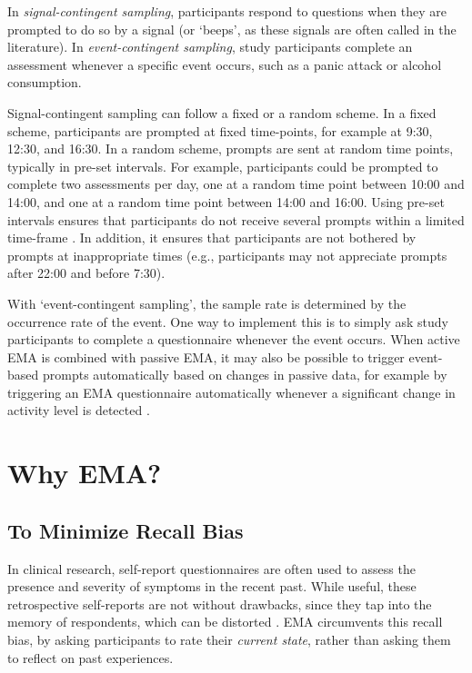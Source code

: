 \documentclass[]{book}
\begin{document}
In \emph{signal-contingent sampling}, participants respond to questions
when they are prompted to do so by a signal (or `beeps', as these
signals are often called in the literature). In \emph{event-contingent
sampling}, study participants complete an assessment whenever a specific
event occurs, such as a panic attack or alcohol consumption.

Signal-contingent sampling can follow a fixed or a random scheme. In a
fixed scheme, participants are prompted at fixed time-points, for
example at 9:30, 12:30, and 16:30. In a random scheme, prompts are sent
at random time points, typically in pre-set intervals. For example,
participants could be prompted to complete two assessments per day, one
at a random time point between 10:00 and 14:00, and one at a random time
point between 14:00 and 16:00. Using pre-set intervals ensures that
participants do not receive several prompts within a limited time-frame
\citep{Piasecki2007}. In addition, it ensures that participants are not
bothered by prompts at inappropriate times (e.g., participants may not
appreciate prompts after 22:00 and before 7:30).

With `event-contingent sampling', the sample rate is determined by the
occurrence rate of the event. One way to implement this is to simply ask
study participants to complete a questionnaire whenever the event
occurs. When active EMA is combined with passive EMA, it may also be
possible to trigger event-based prompts automatically based on changes
in passive data, for example by triggering an EMA questionnaire
automatically whenever a significant change in activity level is
detected \citep{Smyth2003}.

\section{Why EMA?}\label{why-ema}

\subsection{To Minimize Recall Bias}\label{to-minimize-recall-bias}


In clinical research, self-report questionnaires are often used to
assess the presence and severity of symptoms in the recent past. While
useful, these retrospective self-reports are not without drawbacks,
since they tap into the memory of respondents, which can be distorted
\citep{Shiffman2008, Moore2016}. EMA circumvents this recall bias, by
asking participants to rate their \emph{current state}, rather than
asking them to reflect on past experiences.
\end{document}
